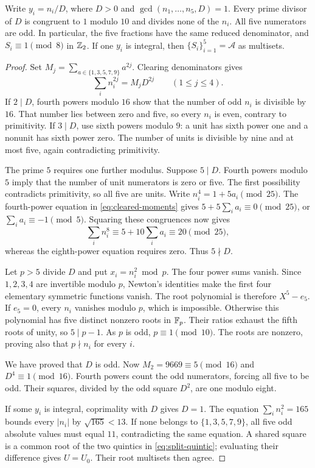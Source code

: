 \begin{lemma}[Denominators]\label{lem:progression-denominators}
Write $y_i=n_i/D$, where $D>0$ and
$\gcd(n_1,\ldots,n_5,D)=1$. Every prime divisor of $D$ is congruent to
$1$ modulo $10$ and divides none of the $n_i$. All five numerators are
odd. In particular, the five fractions have the same reduced denominator,
and $S_i\equiv1\pmod8$ in $\mathbb Z_2$. If one $y_i$ is integral, then
$\{S_i\}_{i=1}^5=\mathcal A$ as multisets.
\end{lemma}
\begin{proof}
Set $M_j=\sum_{a\in\{1,3,5,7,9\}}a^{2j}$. Clearing denominators gives
\begin{equation}\label{eq:cleared-moments}
 \sum_i n_i^{2j}=M_jD^{2j}\qquad(1\leq j\leq4).
\end{equation}
If $2\mid D$, fourth powers modulo $16$ show that the number of odd
$n_i$ is divisible by $16$. That number lies between zero and five,
so every $n_i$ is even, contrary to primitivity. If $3\mid D$, use
sixth powers modulo $9$: a unit has sixth power one and a nonunit
has sixth power zero. The number of units is divisible by nine and
at most five, again contradicting primitivity.

The prime $5$ requires one further modulus. Suppose $5\mid D$.
Fourth powers modulo $5$ imply that the number of unit numerators
is zero or five. The first possibility contradicts primitivity,
so all five are units. Write $n_i^4=1+5a_i\pmod{25}$.
The fourth-power equation in \eqref{eq:cleared-moments} gives
$5+5\sum_i a_i\equiv0\pmod{25}$, or $\sum_i a_i\equiv-1\pmod5$.
Squaring these congruences now gives
\[
 \sum_i n_i^8\equiv5+10\sum_i a_i\equiv20\pmod{25},
\]
whereas the eighth-power equation requires zero. Thus $5\nmid D$.

Let $p>5$ divide $D$ and put $x_i=n_i^2\bmod p$. The four power
sums vanish. Since $1,2,3,4$ are invertible modulo $p$, Newton's
identities make the first four elementary symmetric functions vanish.
The root polynomial is therefore $X^5-e_5$. If $e_5=0$, every $n_i$
vanishes modulo $p$, which is impossible. Otherwise this polynomial
has five distinct nonzero roots in $\mathbb F_p$. Their ratios exhaust the
fifth roots of unity, so $5\mid p-1$. As $p$ is odd, $p\equiv1\pmod{10}$.
The roots are nonzero, proving also that $p\nmid n_i$ for every $i$.

We have proved that $D$ is odd. Now $M_2=9669\equiv5\pmod{16}$ and
$D^4\equiv1\pmod{16}$. Fourth powers count the odd numerators, forcing
all five to be odd. Their squares, divided by the odd square $D^2$,
are one modulo eight.

If some $y_i$ is integral, coprimality with $D$ gives $D=1$.
The equation $\sum_i n_i^2=165$ bounds every $|n_i|$ by
$\sqrt{165}<13$. If none belongs to $\{1,3,5,7,9\}$, all five odd
absolute values must equal $11$, contradicting the same equation.
A shared square is a common root of the two quintics in
\eqref{eq:split-quintic}; evaluating their difference gives $U=U_0$.
Their root multisets then agree.
\end{proof}

